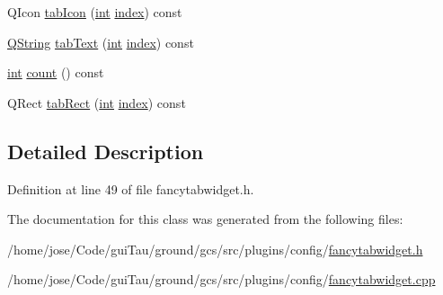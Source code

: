 \begin{DoxyCompactItemize}
\item 
Q\-Icon \hyperlink{group___core_plugin_ga9417afde2ee68f8fe8074235c10e8566}{tab\-Icon} (\hyperlink{ioapi_8h_a787fa3cf048117ba7123753c1e74fcd6}{int} \hyperlink{glext_8h_ab47dd9958bcadea08866b42bf358e95e}{index}) const 
\item 
\hyperlink{group___u_a_v_objects_plugin_gab9d252f49c333c94a72f97ce3105a32d}{Q\-String} \hyperlink{group___core_plugin_ga27be53a0b602c30ace273f7e3b10612a}{tab\-Text} (\hyperlink{ioapi_8h_a787fa3cf048117ba7123753c1e74fcd6}{int} \hyperlink{glext_8h_ab47dd9958bcadea08866b42bf358e95e}{index}) const 
\item 
\hyperlink{ioapi_8h_a787fa3cf048117ba7123753c1e74fcd6}{int} \hyperlink{group___core_plugin_ga6d406edf7fec053848aeced489074d72}{count} () const 
\item 
Q\-Rect \hyperlink{group___core_plugin_ga73860a10ee1c7ab8ecc257d227287058}{tab\-Rect} (\hyperlink{ioapi_8h_a787fa3cf048117ba7123753c1e74fcd6}{int} \hyperlink{glext_8h_ab47dd9958bcadea08866b42bf358e95e}{index}) const 
\end{DoxyCompactItemize}


\subsection{Detailed Description}


Definition at line 49 of file fancytabwidget.\-h.



The documentation for this class was generated from the following files\-:\begin{DoxyCompactItemize}
\item 
/home/jose/\-Code/gui\-Tau/ground/gcs/src/plugins/config/\hyperlink{config_2fancytabwidget_8h}{fancytabwidget.\-h}\item 
/home/jose/\-Code/gui\-Tau/ground/gcs/src/plugins/config/\hyperlink{config_2fancytabwidget_8cpp}{fancytabwidget.\-cpp}\end{DoxyCompactItemize}
